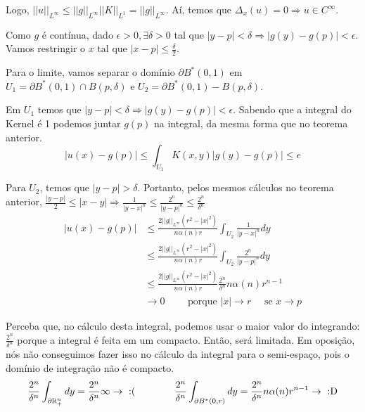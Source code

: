\documentclass[11pt]{article}
\newcommand{\p}{\partial}
\newcommand{\e}{\epsilon}
\newcommand{\norm}[2]{\left|\left|#1\right|\right|_{L^{#2}}}
\begin{document}
Logo, \( \norm{u}{\infty}  \leq \norm{g}{\infty} \norm{K}{1} = \norm{g}{\infty}\). Aí, temos que \( \Delta_x (u)=0  \Rightarrow u \in C^\infty\).

Como \(g\) é contínua, dado \(\e > 0, \exists \delta >0 \) tal que \( |y-p| < \delta \Rightarrow |g(y) - g(p)| < \e\). Vamos restringir o \(x\) tal que \(|x-p| \leq \frac{\delta}{2}\).

Para o limite, vamos separar o domínio \(\p B^*(0,1)\) em \( U_1 = \p B^*(0,1) \cap B(p,\delta) \) e \(U_2 = \p B^*(0,1) - B(p,\delta)\).

Em \(U_1\) temos que \(|y-p| < \delta \Rightarrow |g(y) - g(p)|< \e\). Sabendo que a integral do Kernel é 1 podemos juntar \(g(p)\) na integral, da mesma forma que no teorema anterior. \[|u(x) - g(p)| \leq \int_{U_1} K(x,y) |g(y) - g(p)| \leq e \]

Para \(U_2\), temos que \(|y-p|>\delta \).  Portanto, pelos mesmos cálculos no teorema anterior, \( \frac{|y-p|}{2} \leq |x-y| \Rightarrow \frac{1}{|y-x|^n} \leq \frac{2^n}{|y-p|^n} \leq \frac{2^n}{\delta^n} \)
 \begin{align*}
	|u(x) - g(p)| &\leq \frac{2\norm{g}{\infty} (r^2 - |x|^2)}{n \alpha(n) r} \int_{U_2} \frac{1}{|y-x|^n} dy\\
	&\leq \frac{2\norm{g}{\infty} (r^2 - |x|^2)}{n \alpha(n) r} \int_{U_2} \frac{2^n}{|y-p|^n} dy\\
	&\leq \frac{2\norm{g}{\infty} (r^2 - |x|^2)}{n \alpha(n) r} \frac{2^n}{\delta^n} n\alpha(n) r^{n-1}\\
	&\rightarrow 0 \qquad\text{ porque } |x| \rightarrow r \quad \text{ se } x \rightarrow p 
\end{align*}

Perceba que, no cálculo desta integral, podemos usar o maior valor do integrando: \(\frac{2^n}{\delta^n}\) porque a integral é feita em um compacto. Então, será limitada. Em oposição, nós não conseguimos fazer isso no cálculo da integral para o semi-espaço, pois o domínio de integração não é compacto.
\[\frac{2^n}{\delta^n}\int_{\p\seR} dy = \frac{2^n}{\delta^n} \infty \rightarrow  \ \text{:(} \qquad\qquad
\frac{2^n}{\delta^n}\int_{\p B^*(0,r)} dy = \frac{2^n}{\delta^n} n \alpha(n) r^{n-1} \rightarrow  \ \text{:D} \]
\end{document}
